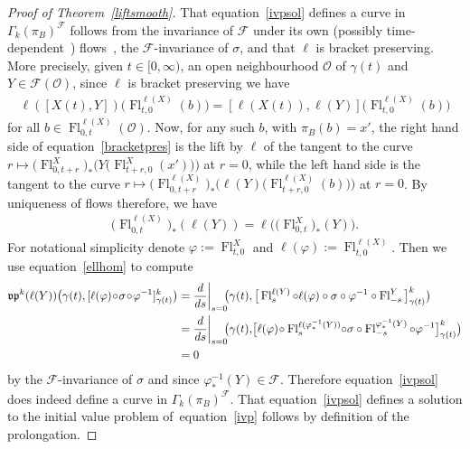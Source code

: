 \documentclass[11pt]{article}
\numberwithin{equation}{section}
\numberwithin{equation}{section}
\def\Fl{\operatorname{Fl}}
\def\FF{{\mathcal{F}}}
\def\OO{{\mathcal{O}}}
\def\vpf{{\mathfrak{vp}}}
\begin{document}
\begin{proof}[Proof of Theorem~\ref{liftsmooth}]
That equation~\eqref{ivpsol} defines a curve in $\Gamma_{k}(\pi_{B})^{\FF}$ follows from the inva\-riance of $\FF$ under its own (possibly time-dependent~\cite[Lemma~3.3]{VilGar1}) flows~\cite[Proposition~1.6]{iakovos2}, the $\FF$-invariance of $\sigma$, and that $\ell$ is bracket preserving. More precisely, given $t\in[0,\infty)$, an open neighbourhood $\OO$ of $\gamma(t)$ and $Y\in\FF(\OO)$, since $\ell$ is bracket preserving we have
\begin{gather}\label{bracketpres}
\ell([X(t),Y])\big(\Fl^{\ell(X)}_{t,0}(b)\big) = [\ell(X(t)),\ell(Y)]\big(\Fl^{\ell(X)}_{t,0}(b)\big)
\end{gather}
for all $b\in\Fl^{\ell(X)}_{0,t}(\OO)$. Now, for any such $b$, with $\pi_{B}(b) = x'$, the right hand side of equation~\eqref{bracketpres} is the lift by $\ell$ of the tangent to the curve $r\mapsto\big(\Fl^{X}_{0,t+r}\big)_{*}\big(Y\big(\Fl_{t+r,0}^{X}(x')\big)\big)$ at $r = 0$,
while the left hand side is the tangent to the curve $r\mapsto \big(\Fl^{\ell(X)}_{0,t+r}\big)_{*}\big(\ell(Y)\big(\Fl^{\ell(X)}_{t+r,0}(b)\big)\big)$ at $r=0$. By uniqueness of flows therefore, we have
\begin{gather}\label{ellhom}
\big(\Fl^{\ell(X)}_{0,t}\big)_{*}(\ell(Y)) = \ell\big(\big(\Fl^{X}_{0,t}\big)_{*}(Y)\big).
\end{gather}
For notational simplicity denote $\varphi:=\Fl^{X}_{t,0}$ and $\ell(\varphi):=\Fl^{\ell(X)}_{t,0}$. Then we use equation~\eqref{ellhom} to compute
\begin{align*}
\vpf^{k}(\ell(Y))\big(\gamma(t),[\ell(\varphi)\!\circ\!\sigma\!\circ\!\varphi^{-1}]^{k}_{\gamma(t)}\big)
&= \frac{\rm d}{{\rm d}s}\bigg|_{s=0}\!\!\big(\gamma(t),\big[\Fl^{\ell(Y)}_{s}\circ\ell(\varphi) \circ\sigma\circ\varphi^{-1}\circ\Fl^{Y}_{-s}\big]^{k}_{\gamma(t)}\big)
\\
&= \frac{\rm d}{{\rm d}s}\bigg|_{s=0}\!\!\big(\gamma(t),\!\big[\ell(\varphi) \!\circ\Fl^{\ell(\varphi^{-1}_{*}(Y))}_{s}\! \circ\sigma\circ\Fl^{\varphi^{-1}_{*}(Y)}_{-s} \circ\varphi^{-1}\big]^{k}_{\gamma(t)}\big)
\\
&= 0
\end{align*}
by the $\FF$-invariance of $\sigma$ and since $\varphi^{-1}_{*}(Y)\in\FF$. Therefore equation~\eqref{ivpsol} does indeed define a curve in $\Gamma_{k}(\pi_{B})^{\FF}$. That equation~\eqref{ivpsol} defines a solution to the initial value problem of~equation~\eqref{ivp} follows by definition of the prolongation.


\end{proof}
\end{document}
